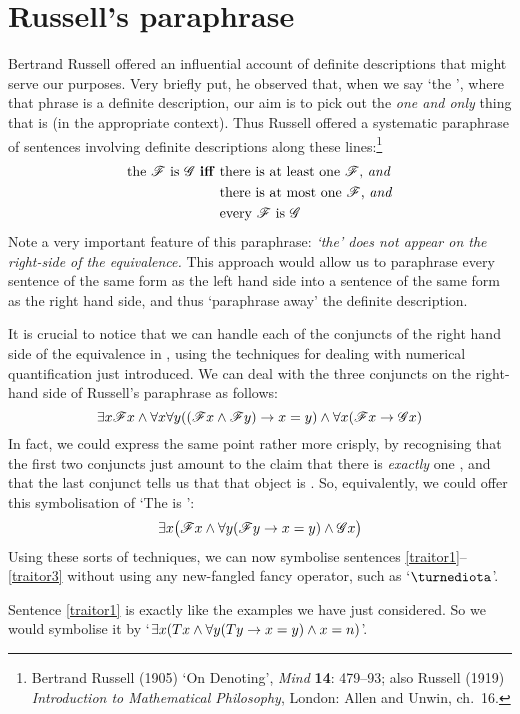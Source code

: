 \section{Russell's paraphrase}
Bertrand Russell offered an influential account of definite descriptions that might serve our purposes. Very briefly put, he observed that, when we say `the ', where that phrase is a definite description, our aim is to pick out the \emph{one and only} thing that is  (in the appropriate context). Thus Russell offered a systematic paraphrase of sentences involving definite descriptions along these lines:\footnote{Bertrand Russell (1905) `On Denoting', \emph{Mind} \textbf{14}: 479–93; also Russell (1919) \emph{Introduction to Mathematical Philosophy}, London: Allen and Unwin, ch.\ 16.}
	\begin{align*}
		\text{the \ensuremath{\mathscr{F}} is \ensuremath{\mathscr{G}} \textbf{iff} }&\text{there is at least one \ensuremath{\mathscr{F}}, \emph{and}}\\
	&\text{there is at most one \ensuremath{\mathscr{F}}, \emph{and}}\\	
	&\text{every \ensuremath{\mathscr{F}} is \ensuremath{\mathscr{G}}}
\end{align*}
Note a very important feature of this paraphrase: \emph{`the' does not appear on the right-side of the equivalence.} This approach would allow us to paraphrase every sentence of the same form as the left hand side into a sentence of the same form as the right hand side, and thus `paraphrase away' the definite description.  

It is crucial to notice that we can handle each of the conjuncts of the right hand side of the equivalence in \FOL, using the techniques for dealing with numerical quantification just introduced. We can deal with the three conjuncts on the right-hand side of Russell's paraphrase as follows:
	$$\exists x \mathscr{F}x \wedge \forall x \forall y ((\mathscr{F}x \wedge \mathscr{F}y) \rightarrow x = y) \wedge \forall x (\mathscr{F}x \rightarrow \mathscr{G}x)$$
In fact, we could express the same point rather more crisply, by recognising that the first two conjuncts just amount to the claim that there is \emph{exactly} one , and that the last conjunct tells us that that object is . So, equivalently, we could offer this symbolisation of `The  is ':
	$$\exists x \bigl(\mathscr{F}x \wedge \forall y (\mathscr{F}y \rightarrow x = y) \wedge \mathscr{G}x\bigr)$$
Using these sorts of techniques, we can now symbolise sentences \ref{traitor1}–\ref{traitor3} without using any new-fangled fancy operator, such as `$\maththe$'. 

Sentence \ref{traitor1} is exactly like the examples we have just considered. So we would symbolise it by `$\exists x (Tx \wedge \forall y(Ty \rightarrow x = y) \wedge x = n)$'. 

